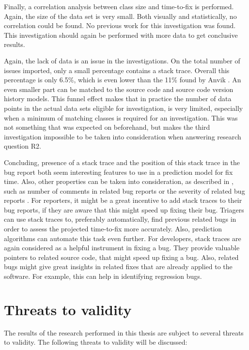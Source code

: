 Finally, a correlation analysis between class size and time-to-fix is performed. Again, the size of the data set is very small. Both visually and statistically, no correlation could be found. No previous work for this investigation was found. This investigation should again be performed with more data to get conclusive results.

Again, the lack of data is an issue in the investigations. On the total number of issues imported, only a small percentage contains a stack trace. Overall this percentage is only 6.5\%, which is even lower than the 11\% found by Anvik \cite{Anvik2006}. An even smaller part can be matched to the source code and source code version history models. This funnel effect makes that in practice the number of data points in the actual data sets eligible for investigation, is very limited, especially when a minimum of matching classes is required for an investigation. This was not something that was expected on beforehand, but makes the third investigation impossible to be taken into consideration when answering research question R2.

Concluding, presence of a stack trace and the position of this stack trace in the bug report both seem interesting features to use in a prediction model for fix time. Also, other properties can be taken into consideration, as described in \cite{Kim2006,Weiss2007,Panjer2007,Giger2010}, such as number of comments in related bug reports or the severity of related bug reports \cite{Weiss2007}. For reporters, it might be a great incentive to add stack traces to their bug reports, if they are aware that this might speed up fixing their bug. Triagers can use stack traces to, preferably automatically, find previous related bugs in order to assess the projected time-to-fix more accurately. Also, prediction algorithms can automate this task even further. For developers, stack traces are again considered as a helpful instrument in fixing a bug. They provide valuable pointers to related source code, that might speed up fixing a bug. Also, related bugs might give great insights in related fixes that are already applied to the software. For example, this can help in identifying regression bugs.


\section{Threats to validity} %
\label{sec:threats_to_validity}
The results of the research performed in this thesis are subject to several threats to validity. The following threats to validity will be discussed:

